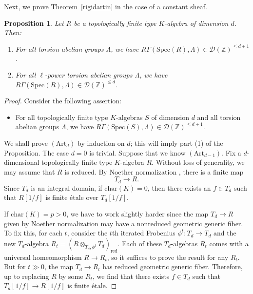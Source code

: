 \documentclass[reqno]{amsart}
\newcommand{\spec}{\mathrm{Spec}}
\newcommand{\D}{\mathcal{D}}
\newtheorem{proposition}[theorem]{Proposition}
\theoremstyle{definition}
\begin{document}
Next, we prove 
Theorem~\ref{rigidartin} in the case of a constant sheaf. 
\begin{proposition} 
\label{rigidartinconstant}
Let $R$ be a topologically finite type $K$-algebra of dimension $d$. Then: 
\begin{enumerate}
\item For all torsion abelian groups $\Lambda$, we have $R \Gamma( \spec(R),
\Lambda) \in \D (\mathbb{Z})^{\leq d+1}$. 
\item For all $\ell$-power torsion abelian groups $\Lambda$, we have $R \Gamma( \spec(R),
\Lambda) \in \D (\mathbb{Z})^{\leq d}$. 
\end{enumerate}
\end{proposition} 
\begin{proof}
Consider the following assertion:

\begin{itemize}[leftmargin=0.8in, rightmargin=0.8in]
\item[$(\mathrm{Art}_d):$] For all topologically finite type $K$-algebras $S$ of dimension $d$ and all
torsion abelian groups $\Lambda$, we have $R \Gamma(\spec(S), \Lambda)  \in \D(\mathbb{Z})^{\leq d + 1}$.
\end{itemize}


We shall prove $(\mathrm{Art}_d)$ by induction on $d$; this will imply part (1) of the Proposition.  The case $d  = 0$ is trivial.  Suppose that we know $(\mathrm{Art}_{d-1})$.  Fix a $d$-dimensional topologically finite type $K$-algebra $R$. 
Without loss of generality, we may assume that $R$ is reduced. 
By Noether normalization \cite[Sec.~6.1.2, Cor.~2]{BGR}, there is a finite map 
\[ T_d \to R.  \]
Since $T_d$ is an integral domain, if $\mathrm{char}(K) = 0$, then  there exists
an $f \in T_d$ such
that $R[1/f]$ is finite \'etale over $T_d[1/f]$. 

If $\mathrm{char}(K) = p> 0$, 
we have to work slightly harder since the map $T_d \to R$ given by Noether
normalization may have a nonreduced geometric generic fiber. 
To fix this, for each $t$, 
consider the $t$th iterated Frobenius $\phi^t\colon T_d \to T_d$ and the new
$T_d$-algebra $R_t = (R
\otimes_{T_d, \phi^t} T_d)_{\mathrm{red}}$. 
Each of these $T_d$-algebras $R_t$ comes with a universal homeomorphism $R
\to R_t$, so it suffices to prove the result 
for any $R_t$. But for $t \gg 0$, the map $T_d \to R_t$ has reduced geometric
generic fiber. 
Therefore, up to replacing $R$ by some $R_t$, we find that there exists $f \in
T_d$ such that $T_d[1/f] \to R[1/f]$ is finite \'etale. 



\end{proof}
\end{document}
